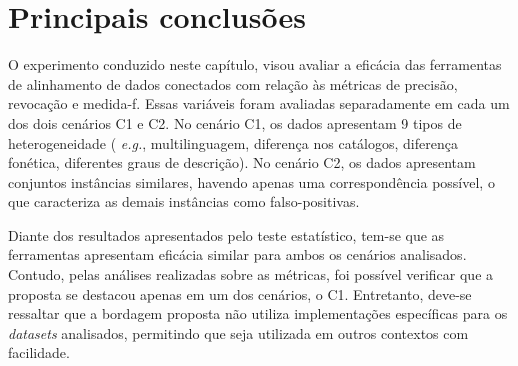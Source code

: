 \section{Principais conclusões}
O experimento conduzido neste capítulo, visou avaliar a eficácia das ferramentas de alinhamento de dados conectados com relação às métricas de precisão, revocação e medida-f. Essas variáveis foram avaliadas separadamente em cada um dos dois cenários C1 e C2. No cenário C1, os dados apresentam 9 tipos de heterogeneidade ( \textit{e.g.}, multilinguagem, diferença nos catálogos, diferença fonética, diferentes graus de descrição). No cenário C2, os dados apresentam conjuntos instâncias similares, havendo apenas uma correspondência possível, o que caracteriza as demais instâncias como falso-positivas.

Diante dos resultados apresentados pelo teste estatístico, tem-se que as ferramentas apresentam eficácia similar para ambos os cenários analisados.  Contudo, pelas análises realizadas sobre as métricas, foi possível verificar que a proposta se destacou apenas em um dos cenários, o C1. Entretanto, deve-se ressaltar que a bordagem proposta não utiliza implementações específicas para os \textit{datasets} analisados, permitindo que seja utilizada em outros contextos com facilidade.